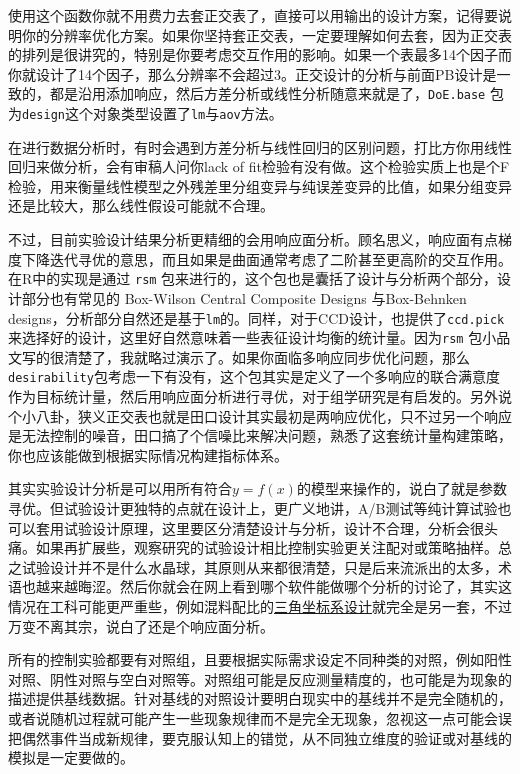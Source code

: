 \documentclass[]{tufte-book}
\begin{document}
使用这个函数你就不用费力去套正交表了，直接可以用输出的设计方案，记得要说明你的分辨率优化方案。如果你坚持套正交表，一定要理解如何去套，因为正交表的排列是很讲究的，特别是你要考虑交互作用的影响。如果一个表最多14个因子而你就设计了14个因子，那么分辨率不会超过3。正交设计的分析与前面PB设计是一致的，都是沿用添加响应，然后方差分析或线性分析随意来就是了，\texttt{DoE.base} 包为\texttt{design}这个对象类型设置了\texttt{lm}与\texttt{aov}方法。

在进行数据分析时，有时会遇到方差分析与线性回归的区别问题，打比方你用线性回归来做分析，会有审稿人问你lack of fit检验有没有做。这个检验实质上也是个F检验，用来衡量线性模型之外残差里分组变异与纯误差变异的比值，如果分组变异还是比较大，那么线性假设可能就不合理。

不过，目前实验设计结果分析更精细的会用响应面分析。顾名思义，响应面有点梯度下降迭代寻优的意思，而且如果是曲面通常考虑了二阶甚至更高阶的交互作用。在R中的实现是通过 \texttt{rsm} 包来进行的，这个包也是囊括了设计与分析两个部分，设计部分也有常见的 Box-Wilson Central Composite Designs 与Box-Behnken designs，分析部分自然还是基于\texttt{lm}的。同样，对于CCD设计，也提供了\texttt{ccd.pick}来选择好的设计，这里好自然意味着一些表征设计均衡的统计量。因为\texttt{rsm} 包小品文写的很清楚了，我就略过演示了。如果你面临多响应同步优化问题，那么\texttt{desirability}包考虑一下有没有，这个包其实是定义了一个多响应的联合满意度作为目标统计量，然后用响应面分析进行寻优，对于组学研究是有启发的。另外说个小八卦，狭义正交表也就是田口设计其实最初是两响应优化，只不过另一个响应是无法控制的噪音，田口搞了个信噪比来解决问题，熟悉了这套统计量构建策略，你也应该能做到根据实际情况构建指标体系。

其实实验设计分析是可以用所有符合\(y = f(x)\)的模型来操作的，说白了就是参数寻优。但试验设计更独特的点就在设计上，更广义地讲，A/B测试等纯计算试验也可以套用试验设计原理，这里要区分清楚设计与分析，设计不合理，分析会很头痛。如果再扩展些，观察研究的试验设计相比控制实验更关注配对或策略抽样。总之试验设计并不是什么水晶球，其原则从来都很清楚，只是后来流派出的太多，术语也越来越晦涩。然后你就会在网上看到哪个软件能做哪个分析的讨论了，其实这情况在工科可能更严重些，例如混料配比的\href{https://support.minitab.com/zh-cn/minitab/18/help-and-how-to/modeling-statistics/doe/supporting-topics/mixture-designs/what-is-a-mixture-design/}{三角坐标系设计}就完全是另一套，不过万变不离其宗，说白了还是个响应面分析。

所有的控制实验都要有对照组，且要根据实际需求设定不同种类的对照，例如阳性对照、阴性对照与空白对照等。对照组可能是反应测量精度的，也可能是为现象的描述提供基线数据。针对基线的对照设计要明白现实中的基线并不是完全随机的，或者说随机过程就可能产生一些现象规律而不是完全无现象，忽视这一点可能会误把偶然事件当成新规律，要克服认知上的错觉，从不同独立维度的验证或对基线的模拟是一定要做的。
\end{document}
